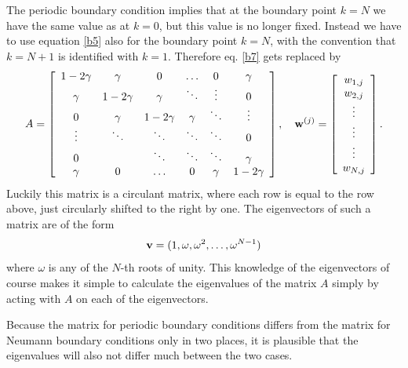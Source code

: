 {{The periodic boundary condition implies that at the boundary point
$k=N$ we have the same value as at $k=0$, but this value is no longer fixed.
Instead we have to use equation \eqref{b5} also for the boundary point $k=N$, 
with the convention that $k=N+1$ is identified with $k=1$. Therefore
eq. \eqref{b7} gets replaced by
\begin{equation}
A=\left[
\begin{array}{cccccc}
1-2\gamma &\gamma &0      &\dots  &0 &\gamma \\
\gamma &1-2\gamma &\gamma &\ddots  &\vdots &0\\
0      &\gamma &1-2\gamma &\gamma &\ddots &\vdots \\
\vdots &\ddots &\ddots &\ddots &\ddots &0 \\
0 &       &\ddots &\ddots &\ddots &\gamma \\
\gamma      &0  &\dots  &0      &\gamma &1-2\gamma
\end{array}\right], \quad
{\bf w}^{(j)}=\left[
\begin{array}{c}
w_{1,j} \\
w_{2,j} \\
\vdots \\
\vdots \\
\vdots \\
w_{N,j}
\end{array}\right].
\label{bp7}
\end{equation}
Luckily this matrix is a
circulant matrix, where each row is equal to the row above, just circularly
shifted to the right by one. 
The eigenvectors of such a matrix are of the form
\[{\bf v} = (1,\omega,\omega^2,\dots,\omega^{N-1})\]
where $\omega$ is any of the $N$-th roots of unity. This knowledge of the
eigenvectors of course makes it simple to calculate the eigenvalues
of the matrix $A$ simply by acting with $A$ on each of the eigenvectors.

Because the matrix for periodic boundary conditions differs from the matrix
for Neumann boundary conditions only in two places, it is plausible that
the eigenvalues will also not differ much between the two cases.

}}
